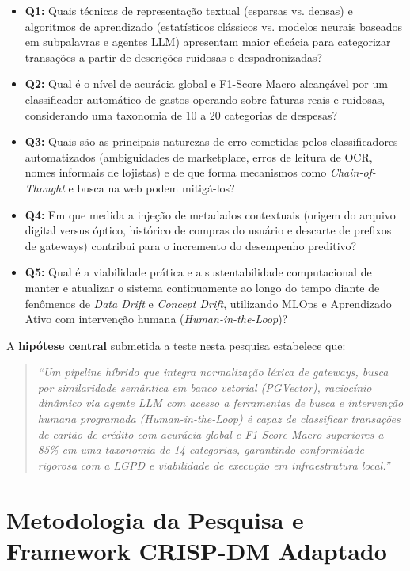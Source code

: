\documentclass[
	12pt,				
	openright,			
	oneside,			
	a4paper,			
	english,			
	brazil				
	]{abntex2}
\begin{document}
\begin{itemize}
    \item \textbf{Q1:} Quais técnicas de representação textual (esparsas vs. densas) e algoritmos de aprendizado (estatísticos clássicos vs. modelos neurais baseados em subpalavras e agentes LLM) apresentam maior eficácia para categorizar transações a partir de descrições ruidosas e despadronizadas?
    \item \textbf{Q2:} Qual é o nível de acurácia global e F1-Score Macro alcançável por um classificador automático de gastos operando sobre faturas reais e ruidosas, considerando uma taxonomia de 10 a 20 categorias de despesas?
    \item \textbf{Q3:} Quais são as principais naturezas de erro cometidas pelos classificadores automatizados (ambiguidades de marketplace, erros de leitura de OCR, nomes informais de lojistas) e de que forma mecanismos como \textit{Chain-of-Thought} e busca na web podem mitigá-los?
    \item \textbf{Q4:} Em que medida a injeção de metadados contextuais (origem do arquivo digital versus óptico, histórico de compras do usuário e descarte de prefixos de gateways) contribui para o incremento do desempenho preditivo?
    \item \textbf{Q5:} Qual é a viabilidade prática e a sustentabilidade computacional de manter e atualizar o sistema continuamente ao longo do tempo diante de fenômenos de \textit{Data Drift} e \textit{Concept Drift}, utilizando MLOps e Aprendizado Ativo com intervenção humana (\textit{Human-in-the-Loop})?
\end{itemize}

A \textbf{hipótese central} submetida a teste nesta pesquisa estabelece que:
\begin{quote}
    \textit{``Um pipeline híbrido que integra normalização léxica de gateways, busca por similaridade semântica em banco vetorial (PGVector), raciocínio dinâmico via agente LLM com acesso a ferramentas de busca e intervenção humana programada (\textit{Human-in-the-Loop}) é capaz de classificar transações de cartão de crédito com acurácia global e F1-Score Macro superiores a 85\% em uma taxonomia de 14 categorias, garantindo conformidade rigorosa com a LGPD e viabilidade de execução em infraestrutura local.''}
\end{quote}

\section{Metodologia da Pesquisa e Framework CRISP-DM Adaptado}
\label{sec:sol_crisp_dm}
\end{document}
